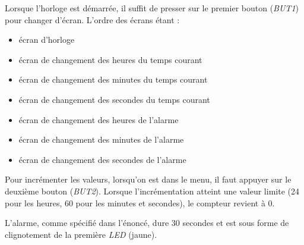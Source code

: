 
Lorsque l'horloge est démarrée, il suffit de presser sur le premier bouton (\textit{BUT1}) pour changer d'écran. L'ordre des écrans étant :

\begin{itemize}
	\item écran d'horloge
	\item écran de changement des heures du temps courant
	\item écran de changement des minutes du temps courant
	\item écran de changement des secondes du temps courant
	\item écran de changement des heures de l'alarme
	\item écran de changement des minutes de l'alarme
	\item écran de changement des secondes de l'alarme
\end{itemize}

Pour incrémenter les valeurs, lorsqu'on est dans le menu, il faut appuyer sur le deuxième bouton (\textit{BUT2}). Lorsque l'incrémentation atteint une valeur limite (24 pour les heures, 60 pour les minutes et secondes), le compteur revient à 0.

L'alarme, comme spécifié dans l'énoncé, dure 30 secondes et est sous forme de clignotement de la première \textit{LED} (jaune). 
